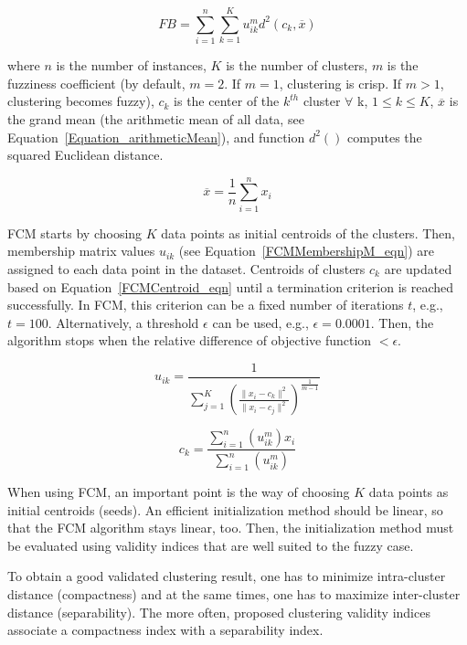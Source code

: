 \documentclass[runningheads,a4paper]{llncs}
\begin{document}
\begin{equation} \label{eqFB}
FB = \sum_{i=1}^n \sum_{k=1}^K  u_{ik}^m d^2 (c_k,\overline{x})
\end{equation}

where $n$ is the number of instances, $K$ is the number of clusters, $m$ is the fuzziness coefficient (by default, $m = 2$. If $m = 1$, clustering is crisp. If $m > 1$, clustering becomes fuzzy), $c_k$ is the center of the $k^{th}$ cluster $\forall$ k, $1 \leq k \leq K$, $\overline{x}$ is the grand mean (the arithmetic mean of all data, see Equation~\ref{Equation_arithmeticMean}), and function $d^2()$ computes the squared Euclidean distance.

\begin{equation} \label{Equation_arithmeticMean}
\overline{x} = \frac{1}{n}\sum_{i=1}^n x_i
\end{equation}

FCM starts by choosing $K$ data points as initial centroids of the clusters. Then, membership matrix values $u_{ik}$ (see Equation~\ref{FCMMembershipM_eqn}) are assigned to each data point in the dataset. Centroids of clusters $c_k$ are updated based on Equation~\ref{FCMCentroid_eqn} until a termination criterion is reached successfully. In FCM, this criterion can be a fixed number of iterations $t$, e.g., $t = 100$. Alternatively, a threshold $\epsilon$ can be used, e.g., $\epsilon = 0.0001$. Then, the algorithm stops when the relative difference of objective function $< \epsilon$.

\begin{equation} \label{FCMMembershipM_eqn}
u_{ik} = \frac{1}{\sum_{j=1}^K (\frac{\|x_i-c_k\|^2}{\|x_i-c_j\|^2})^\frac{1}{m-1}} 
\end{equation} 

\begin{equation} \label{FCMCentroid_eqn}
c_k = \frac{\sum_{i=1}^n(u_{ik}^m)x_i}{\sum_{i=1}^n(u_{ik}^m)}
\end{equation}

When using FCM, an important point is the way of choosing $K$ data points as initial centroids (seeds). An efficient initialization method should be linear, so that the FCM algorithm stays linear, too. Then, the initialization method must be evaluated using validity indices that are well suited to the fuzzy case.

To obtain a good validated clustering result, one has to minimize intra-cluster distance (compactness) and at the same times, one has to maximize inter-cluster distance (separability). The more often, proposed clustering validity indices associate a compactness index with a separability index. 
\end{document}
